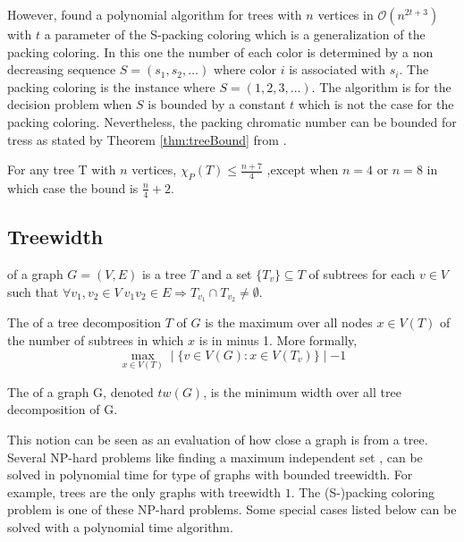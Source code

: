 However, \cite{PCComplexity} found a polynomial algorithm for trees with $n$ vertices in $\mathcal{O}(n^{2t+3})$ with $t$ a parameter of the S-packing coloring which is a generalization of the packing coloring. In this one the number of each color is determined by a non decreasing sequence $S= (s_1,s_2,\dots)$ where color $i$ is associated with $s_i$. The packing coloring is the instance where $S=(1,2,3,\dots)$. The algorithm is for the decision problem when $S$ is bounded by a constant $t$ which is not the case for the packing coloring. Nevertheless, the packing chromatic number can be bounded for tress as stated by Theorem \ref{thm:treeBound} from \cite{broadcastchromatic}. \\

\begin{thm}
\label{thm:treeBound}
For any tree T with $n$ vertices, $\chi_P(T) \leq \frac{n+7}{4}$ ,except when $n=4$ or $n=8$ in which case the bound is $\frac{n}{4} + 2$.
\end{thm}

\subsection{Treewidth}

\begin{mydef}
 of a graph $G=(V,E)$ is a tree $T$ and a set $\{T_v\} \subseteq T $ of subtrees for each $v \in V$ such that $\forall v_1,v_2 \in V\  v_1v_2 \in E \Longrightarrow T_{v_{1}} \cap T_{v_{2}} \neq \emptyset $.\newline
\end{mydef}

\begin{mydef}
The  of a tree decomposition $T$ of $G$ is the maximum over all nodes $x \in V(T)$ of the number of subtrees in which $x$ is in minus 1. More formally,
\[ \max_{x \in V(T)} \mid \lbrace v \in V(G)  : x \in V(T_v) \rbrace \mid - 1 \]
\end{mydef}

\begin{mydef}
The  of a graph G, denoted $tw(G)$, is the minimum width over all tree decomposition of G.
\end{mydef}

This notion can be seen as an evaluation of how close a graph is from a tree. Several NP-hard problems like finding a maximum independent set , can be solved in polynomial time for type of graphs with bounded treewidth. For example, trees are the only graphs with treewidth $1$. The (S-)packing coloring problem is one of these NP-hard problems. Some special cases listed below can be solved with a polynomial time algorithm.

